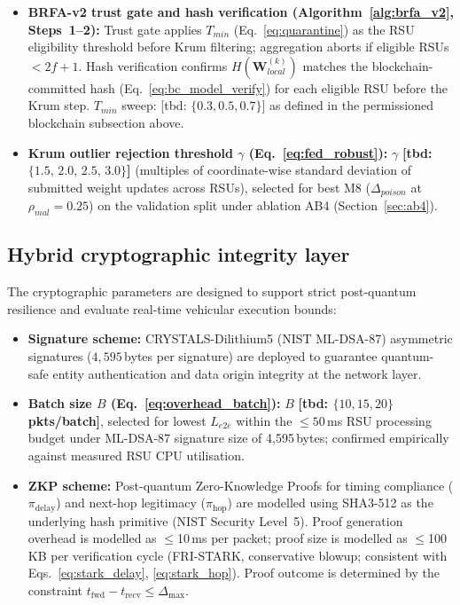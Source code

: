 \documentclass[12pt, a4paper]{report}
\begin{document}
{{\begin{itemize}
    \item \textbf{BRFA-v2 trust gate and hash verification         (Algorithm~\ref{alg:brfa_v2}, Steps~1--2):} Trust gate applies $T_{min}$
            (Eq.~\ref{eq:quarantine}) as the RSU eligibility threshold before Krum filtering; aggregation aborts if eligible RSUs $< 2f{+}1$. Hash verification confirms $H(\mathbf{W}_{local}^{(k)})$ matches the blockchain-committed hash
            (Eq.~\ref{eq:bc_model_verify}) for each eligible RSU before the Krum step.
            $T_{min}$ sweep: [tbd: $\{0.3, 0.5, 0.7\}$] as defined in the permissioned blockchain subsection above.
    \item \textbf{Krum outlier rejection threshold $\gamma$ (Eq.~\ref{eq:fed_robust}):}
        $\gamma$ \textbf{[tbd: $\{1.5,\, 2.0,\, 2.5,\,3.0\}$]} (multiples of coordinate-wise standard deviation of submitted weight updates across RSUs), selected
        for best M8 ($\Delta_{poison}$ at $\rho_{mal} = 0.25$) on the validation split under ablation AB4 (Section~\ref{sec:ab4}).


\end{itemize}

\subsection{Hybrid cryptographic integrity layer}
The cryptographic parameters are designed to support strict post-quantum resilience and evaluate real-time vehicular execution bounds:

\begin{itemize}
    \item \textbf{Signature scheme:} CRYSTALS-Dilithium5 (NIST ML-DSA-87) asymmetric signatures ($4,595$\,bytes per signature) are deployed to guarantee quantum-safe entity authentication and data origin integrity at the network layer.
    
    \item \textbf{Batch size $B$
    (Eq.~\ref{eq:overhead_batch}):}
    $B$ \textbf{[tbd: $\{10, 15, 20\}$\,pkts/batch]},
    selected for lowest $L_{e2e}$ within the
    $\leq 50$\,ms RSU processing budget under
    ML-DSA-87 signature size of 4{,}595\,bytes;
    confirmed empirically against measured RSU
    CPU utilisation.
   

    \item \textbf{ZKP scheme:} Post-quantum Zero-Knowledge Proofs for timing
    compliance ($\pi_{\text{delay}}$) and next-hop legitimacy ($\pi_{\text{hop}}$)
    are modelled using SHA3-512 as the underlying hash primitive (NIST Security
    Level~5). Proof generation overhead is modelled as $\leq$10\,ms per packet;
    proof size is modelled as $\leq$100\,KB per
  verification cycle (FRI-STARK, conservative
  blowup; consistent with Eqs.~\ref{eq:stark_delay},
    \ref{eq:stark_hop}).
 Proof outcome
    is determined by the constraint $t_{\text{fwd}} - t_{\text{recv}} \leq
    \Delta_{\max}$.
    

\end{itemize}}}
\end{document}
